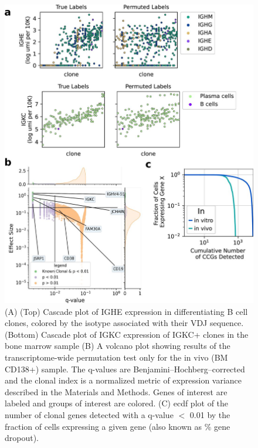 \begin{figure}[hbt!]
\centering
\includegraphics[width=13cm, keepaspectratio]{figs/paper2/figs4_bcd.jpg}
\caption[Analysis of persistent in vivo transcriptional programs.]{(A) (Top) Cascade plot of IGHE expression in differentiating B cell clones, colored by the isotype associated with their VDJ sequence. (Bottom) Cascade plot of IGKC expression of IGKC+ clones in the bone marrow sample (B) A volcano plot showing results of the transcriptome-wide permutation test only for the in vivo (BM CD138+) sample. The q-values are Benjamini–Hochberg–corrected and the clonal index is a normalized metric of expression variance described in the Materials and Methods. Genes of interest are labeled and groups of interest are colored. (C) ecdf plot of the number of clonal genes detected with a q-value $<$ 0.01 by the fraction of cells expressing a given gene (also known as \% gene dropout).}
\label{fig:paper2_fig_s4}
\end{figure}


